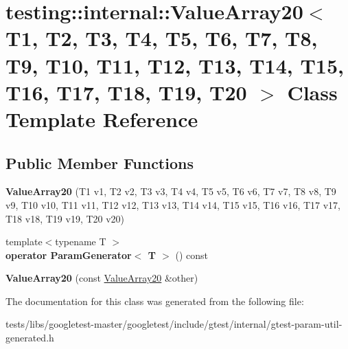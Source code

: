 \hypertarget{classtesting_1_1internal_1_1ValueArray20}{}\section{testing\+:\+:internal\+:\+:Value\+Array20$<$ T1, T2, T3, T4, T5, T6, T7, T8, T9, T10, T11, T12, T13, T14, T15, T16, T17, T18, T19, T20 $>$ Class Template Reference}
\label{classtesting_1_1internal_1_1ValueArray20}
\subsection*{Public Member Functions}
\begin{DoxyCompactItemize}
\item 
\mbox{\label{classtesting_1_1internal_1_1ValueArray20_aafa49e909db9556cdb89692976e80c4a}} 
{\bfseries Value\+Array20} (T1 v1, T2 v2, T3 v3, T4 v4, T5 v5, T6 v6, T7 v7, T8 v8, T9 v9, T10 v10, T11 v11, T12 v12, T13 v13, T14 v14, T15 v15, T16 v16, T17 v17, T18 v18, T19 v19, T20 v20)
\item 
\mbox{\label{classtesting_1_1internal_1_1ValueArray20_abcf63e97d31f62868dab49f1667e9d4f}} 
{\footnotesize template$<$typename T $>$ }\\{\bfseries operator Param\+Generator$<$ T $>$} () const
\item 
\mbox{\label{classtesting_1_1internal_1_1ValueArray20_a965099028a2057212ba388b8017f8e68}} 
{\bfseries Value\+Array20} (const \hyperlink{classtesting_1_1internal_1_1ValueArray20}{Value\+Array20} \&other)
\end{DoxyCompactItemize}


The documentation for this class was generated from the following file\+:\begin{DoxyCompactItemize}
\item 
tests/libs/googletest-\/master/googletest/include/gtest/internal/gtest-\/param-\/util-\/generated.\+h\end{DoxyCompactItemize}
